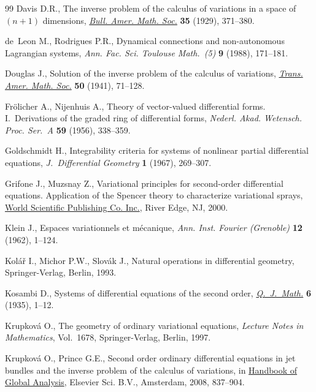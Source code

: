\documentclass[pdftex]{sigma}
\begin{document}
\begin{thebibliography}{99}
Davis D.R., The inverse problem of the calculus of variations in a space of
  {$(n+1)$} dimensions, \href{http://dx.doi.org/10.1090/S0002-9904-1929-04754-2}{\textit{Bull. Amer. Math. Soc.}} \textbf{35} (1929),
  371--380.

de~Leon M., Rodrigues P.R., Dynamical connections and non-autonomous
  {L}agrangian systems, \textit{Ann. Fac. Sci. Toulouse Math.~(5)} \textbf{9}
  (1988), 171--181.

Douglas J., Solution of the inverse problem of the calculus of variations,
  \href{http://dx.doi.org/10.1090/S0002-9947-1941-0004740-5}{\textit{Trans. Amer. Math. Soc.}} \textbf{50} (1941), 71--128.

Fr{\"o}licher A., Nijenhuis A., Theory of vector-valued dif\/ferential forms.
  {I}.~{D}erivations of the graded ring of dif\/ferential forms, \textit{Nederl.
  Akad. Wetensch. Proc. Ser.~A} \textbf{59} (1956), 338--359.

Goldschmidt H., Integrability criteria for systems of nonlinear partial
  dif\/ferential equations, \textit{J.~Differential Geometry} \textbf{1} (1967),
  269--307.

Grifone J., Muzsnay Z., Variational principles for second-order dif\/ferential
  equations. Application of the Spencer theory to characterize variational
  sprays, \href{http://dx.doi.org/10.1142/9789812813596}{World Scientif\/ic Publishing Co. Inc.}, River Edge, NJ, 2000.

Klein J., Espaces variationnels et m\'ecanique, \textit{Ann. Inst. Fourier
  (Grenoble)} \textbf{12} (1962), 1--124.

Kol{\'a}{\v{r}} I., Michor P.W., Slov{\'a}k J., Natural operations in
  dif\/ferential geometry, Springer-Verlag, Berlin, 1993.

Kosambi D., Systems of dif\/ferential equations of the second order,
  \href{http://dx.doi.org/10.1093/qmath/os-6.1.1}{\textit{Q.~J.~Math.}} \textbf{6} (1935), 1--12.

Krupkov{\'a} O., The geometry of ordinary variational equations,
  \textit{Lecture Notes in Mathematics}, Vol.~1678, Springer-Verlag, Berlin,
  1997.

Krupkov{\'a} O., Prince G.E., Second order ordinary dif\/ferential equations in
  jet bundles and the inverse problem of the calculus of variations, in
  \href{http://dx.doi.org/10.1016/B978-044452833-9.50017-6}{Handbook of Global Analysis}, Elsevier Sci. B.V., Amsterdam, 2008, 837--904.


\end{thebibliography}
\end{document}
